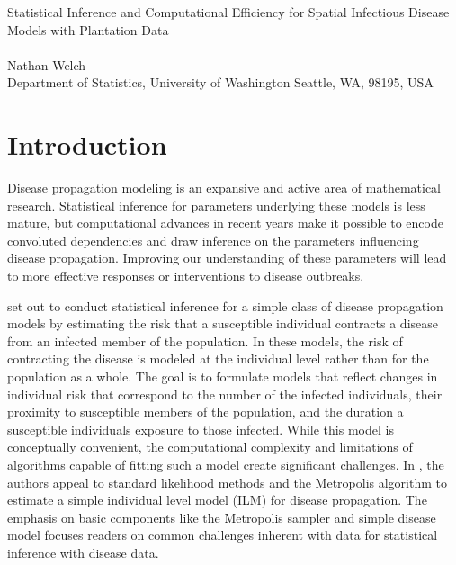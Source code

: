 \documentclass{uwstat572}
\begin{document}

\begin{center}
  {\LARGE Statistical Inference and Computational Efficiency for Spatial Infectious Disease Models with Plantation Data}\\\ \\
  {Nathan Welch \\ 
    Department of Statistics, University of Washington Seattle, WA, 98195, USA
  }
\end{center}

\begin{abstract}
This report examines the findings published in \textit{Statistical inference and computational efficiency for spatial infectious disease models with plantation data} \citet{Brown}. 
This paper aims to conduct statistical inference for parameters associated with a simple individual level infectious disease model. 
Model parameters are estimated using the Metropolis sampling algorithm; however, the computation burden created by fitting even a simple model leads to prohibitively long computation time. 
Statistical and computational methods to overcome the computing challenge are reviewed as a result. 
\end{abstract}

\section{Introduction}

Disease propagation modeling is an expansive and active area of mathematical research.
Statistical inference for parameters underlying these models is less mature, but computational advances in recent years make it possible to encode convoluted dependencies and draw inference on the parameters influencing disease propagation. 
Improving our understanding of these parameters will lead to more effective responses or interventions to disease outbreaks. 

\citet{Brown} set out to conduct statistical inference for a simple class of disease propagation models by estimating the risk that a susceptible individual contracts a disease from an infected member of the population. 
In these models, the risk of contracting the disease is modeled at the individual level rather than for the population as a whole. 
The goal is to formulate models that reflect changes in individual risk that correspond to the number of the infected individuals, their proximity to susceptible members of the population, and the duration a susceptible individuals  exposure to those infected. 
While this model is conceptually convenient, the computational complexity and limitations of algorithms capable of fitting such a model create significant challenges.
In \citet{Brown}, the authors appeal to standard likelihood methods and the Metropolis algorithm to estimate a simple individual level model (ILM) for disease propagation.
The emphasis on basic components like the Metropolis sampler and simple disease model focuses readers on common challenges inherent with data for statistical inference with disease data. 
\end{document}
